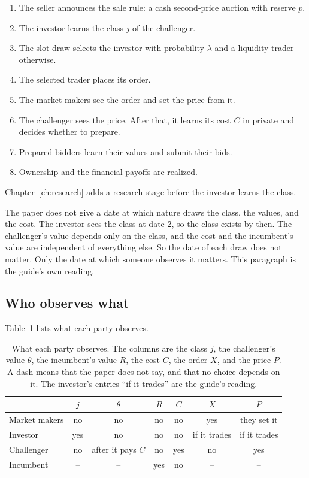 \begin{enumerate}
\item The seller announces the sale rule: a cash second-price auction with reserve \(p\).
\item The investor learns the class \(j\) of the challenger.
\item The slot draw selects the investor with probability \(\lambda\) and a liquidity trader otherwise.
\item The selected trader places its order.
\item The market makers see the order and set the price from it.
\item The challenger sees the price. After that, it learns its cost \(C\) in private and decides whether to prepare.
\item Prepared bidders learn their values and submit their bids.
\item Ownership and the financial payoffs are realized.
\end{enumerate}
Chapter~\ref{ch:research} adds a research stage before the investor learns the class.

The paper does not give a date at which nature draws the class, the values, and the cost.
The investor sees the class at date 2, so the class exists by then.
The challenger's value depends only on the class, and the cost and the incumbent's value are independent of everything else.
So the date of each draw does not matter. Only the date at which someone observes it matters.
This paragraph is the guide's own reading.

\subsection*{Who observes what}

Table~\ref{tab:model-info} lists what each party observes.
\begin{table}[tbp]
\centering\small
\caption{What each party observes. The columns are the class \(j\), the challenger's value \(\theta\), the incumbent's value \(R\), the cost \(C\), the order \(X\), and the price \(P\). A dash means that the paper does not say, and that no choice depends on it. The investor's entries ``if it trades'' are the guide's reading.}\label{tab:model-info}
\begin{tabular}{@{}lcccccc@{}}
\toprule
 & \(j\) & \(\theta\) & \(R\) & \(C\) & \(X\) & \(P\)\\
\midrule
Market makers & no & no & no & no & yes & they set it\\
Investor & yes & no & no & no & if it trades & if it trades\\
Challenger & no & after it pays \(C\) & no & yes & no & yes\\
Incumbent & -- & -- & yes & no & -- & --\\
\bottomrule
\end{tabular}
\end{table}


